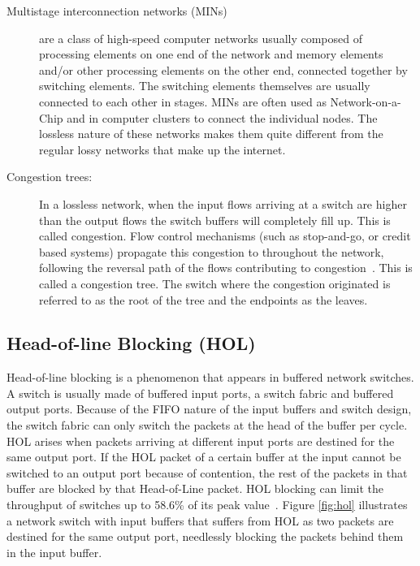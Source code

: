 \begin{description}

\item[Multistage interconnection networks (MINs)] are a class of high-speed computer networks usually composed of processing elements on one end of the network and memory elements and/or other processing elements on the other end, connected together by switching elements. The switching elements themselves are usually connected to each other in stages. MINs are often used as Network-on-a-Chip and in computer clusters to connect the individual nodes. The lossless nature of these networks makes them quite different from the regular lossy networks that make up the internet.

\item[Congestion trees:] In a lossless network, when the input flows arriving at a switch are higher than the output flows the switch buffers will completely fill up. This is called congestion. Flow control mechanisms (such as stop-and-go, or credit based systems) propagate this congestion to throughout the network, following the reversal path of the flows contributing to congestion~\cite{paper1}. This is called a congestion tree. The switch where the congestion originated is referred to as the root of the tree and the endpoints as the leaves. 

\end{description}

\subsection{Head-of-line Blocking (HOL)}\label{S:hol_blocking} Head-of-line blocking is a phenomenon that appears in buffered network switches. A switch is usually made of buffered input ports, a switch fabric and buffered output ports. Because of the FIFO nature of the input buffers and switch design, the switch fabric can only switch the packets at the head of the buffer per cycle. HOL arises when packets arriving at different input ports are destined for the same output port. If the HOL packet of a certain buffer at the input cannot be switched to an output port because of contention, the rest of the packets in that buffer are blocked by that Head-of-Line packet. HOL blocking can limit the throughput of switches up to 58.6\% of its peak value~\cite{hol_thoughput}. Figure \ref{fig:hol} illustrates a network switch with input buffers that suffers from HOL as two packets are destined for the same output port, needlessly blocking the packets behind them in the input buffer.

